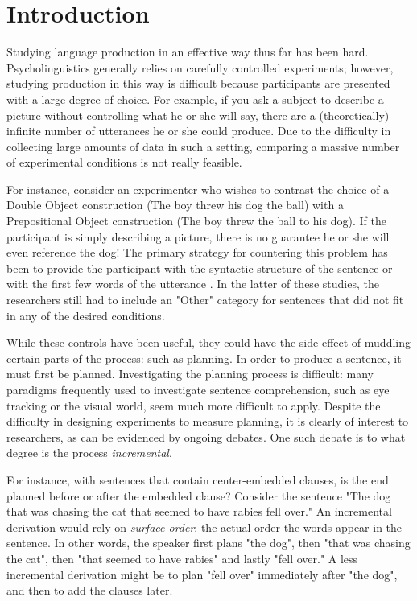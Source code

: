 \section{Introduction}
 Studying language production in an effective way thus far has been hard. Psycholinguistics generally relies on carefully controlled experiments; however, studying production in this way is difficult because participants are presented with a large degree of choice. For example, if you ask a subject to describe a picture without controlling what he or she will say, there are a (theoretically) infinite number of utterances he or she could produce. Due to the difficulty in collecting large amounts of data in such a setting, comparing a massive number of experimental conditions is not really feasible. 
 
 For instance, consider an experimenter who wishes to contrast the choice of a Double Object construction (The boy threw his dog the ball) with a Prepositional Object construction (The boy threw the ball to his dog). If the participant is simply describing a picture, there is no guarantee he or she will even reference the dog! The primary strategy for countering this problem has been to provide the participant with the syntactic structure of the sentence \citep{incremental} or with the first few words of the utterance \citep{chinese}. In the latter of these studies, the researchers still had to include an "Other" category for sentences that did not fit in any of the desired conditions. 
 
 While these controls have been useful, they could have the side effect of muddling certain parts of the process: such as planning. In order to produce a sentence, it must first be planned. Investigating the planning process is difficult: many paradigms frequently used to investigate sentence comprehension, such as eye tracking or the visual world, seem much more difficult to apply. Despite the difficulty in designing experiments to measure planning, it is clearly of interest to researchers, as can be evidenced by ongoing debates. One such debate is to what degree is the process \emph{incremental}. 
 
 For instance, with sentences that contain center-embedded clauses, is the end planned before or after the embedded clause? Consider the sentence "The dog that was chasing the cat that seemed to have rabies fell over." An incremental derivation would rely on \emph{surface order}: the actual order the words appear in the sentence. In other words, the speaker first plans "the dog", then "that was chasing the cat", then "that seemed to have rabies" and lastly "fell over." A less incremental derivation might be to plan "fell over" immediately after "the dog", and then to add the clauses later.
 
